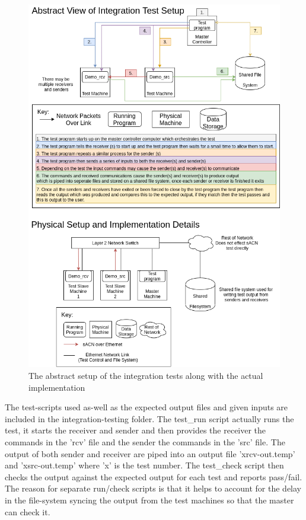 \documentclass[11pt,a4paper]{report}
\begin{document}
\begin{figure}[H]
	\label{INTEGRATION_TEST_SETUP}
	\includegraphics[width=\textwidth]{SH-Project-Intergration-Tests-Abstract-View.png}
	\caption{The abstract setup of the integration tests along with the actual implementation}
\end{figure}

The test-scripts used as-well as the expected output files and given inputs are included in the integration-testing folder. The test\_run script actually runs the test, it starts the receiver and sender and then provides the receiver the commands in the 'rcv' file and the sender the commands in the 'src' file. The output of both sender and receiver are piped into an output file 'xrcv-out.temp' and 'xsrc-out.temp' where 'x' is the test number. The test\_check script then checks the output against the expected output for each test and reports pass/fail. The reason for separate run/check scripts is that it helps to account for the delay in the file-system syncing the output from the test machines so that the master can check it.
\end{document}
